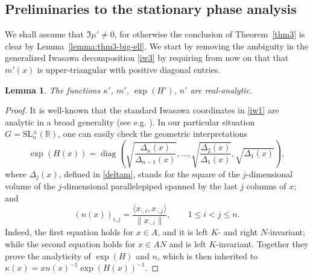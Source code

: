 \documentclass[11pt,oneside]{amsart}
\numberwithin{equation}{section}
\theoremstyle{remark}
\theoremstyle{plain}
\newtheorem{lemma}{Lemma}
\DeclareMathOperator{\diag}{diag}
\newcommand\SL{\mathrm{SL}}
\newcommand\RR{\mathbb{R}}
\renewcommand\leq{\leqslant}
\begin{document}
\subsection{Preliminaries to the stationary phase analysis} 
We shall assume that $\Im\mu'\neq 0$, for otherwise the conclusion of Theorem~\ref{thm3} is clear by Lemma~\ref{lemma:thm3-big-ell}. We start by removing the ambiguity in the generalized Iwasawa decomposition \eqref{iw3} by requiring from now on that that $m'(x)$ is upper-triangular with positive diagonal entries.
\begin{lemma}\label{lemma:iwasawa-coordinates-are-analytic} The functions $\kappa'$, $m'$, $\exp(H')$, $n'$ are real-analytic.
\end{lemma}
\begin{proof} It is well-known that the standard Iwasawa coordinates in \eqref{iw1} are analytic in a broad generality (see e.g. \cite[p.~181]{Helgason-groups-and-geometric-analysis}). In our particular situation $G=\SL_n^{\pm}(\RR)$, one can easily check the geometric interpretations
\[
\exp(H(x))=\diag\left(\sqrt{\frac{\Delta_n(x)}{\Delta_{n-1}(x)}},\dotsc,\sqrt{\frac{\Delta_2(x)}{\Delta_1(x)}},\sqrt{\Delta_1(x)}\right),
\]
where $\Delta_j(x)$, defined in \eqref{deltam}, 
stands for the square of the $j$-dimensional volume of the $j$-dimensional parallelepiped spanned by the last $j$ columns of $x$; and
\[
(n(x))_{i,j}= \frac{\langle x_{\cdot,i},x_{\cdot,j} \rangle}{\|x_{\cdot,i}\|},\qquad 1\leq i<j\leq n.
\]
Indeed, the first equation holds for $x\in A$, and it is left $K$- and right $N$-invariant; while the second equation holds for $x\in AN$ and is left $K$-invariant. Together they prove the analyticity of $\exp(H)$ and $n$, which is then inherited to $\kappa(x)=x n(x)^{-1} \exp(H(x))^{-1}$.


\end{proof}
\end{document}
